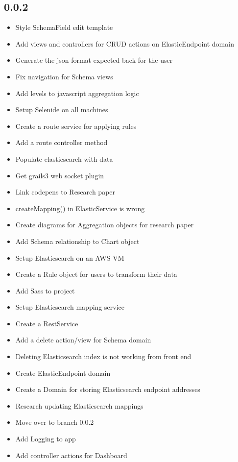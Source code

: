 \documentclass[12pt]{report}
\begin{document}
\subsection*{0.0.2}
\begin{itemize}
\item Style SchemaField edit template
\item Add views and controllers for CRUD actions on ElasticEndpoint domain
\item Generate the json format expected back for the user
\item Fix navigation for Schema views
\item Add levels to javascript aggregation logic
\item Setup Selenide on all machines
\item Create a route service for applying rules
\item Add a route controller method
\item Populate elasticsearch with data
\item Get grails3 web socket plugin
\item Link codepens to Research paper
\item createMapping() in ElasticService is wrong
\item Create diagrams for Aggregation objects for research paper
\item Add Schema relationship to Chart object
\item Setup Elasticsearch on an AWS VM
\item Create a Rule object for users to transform their data
\item Add Sass to project
\item Setup Elasticsearch mapping service
\item Create a RestService
\item Add a delete action/view for Schema domain
\item Deleting Elasticsearch index is not working from front end
\item Create ElasticEndpoint domain
\item Create a Domain for storing Elasticsearch endpoint addresses
\item Research updating Elasticsearch mappings
\item Move over to branch 0.0.2
\item Add Logging to app
\item Add controller actions for Dashboard
\end{itemize}
\end{document}
